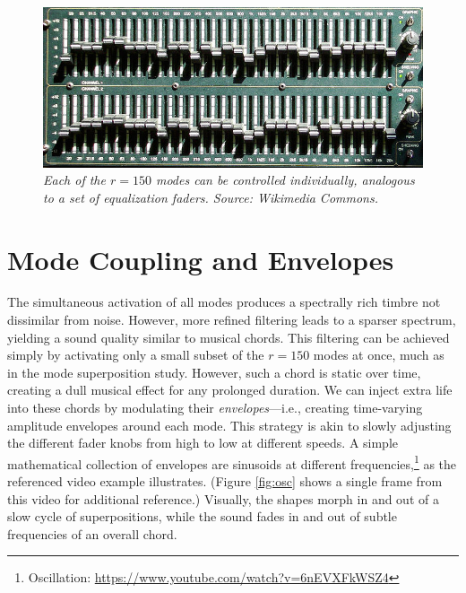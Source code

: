 \begin{figure}[H]
	\centering
	\includegraphics[width=\textwidth]{chap6/figures/faders.jpg}
	\caption{\em Each of the $r = 150$ modes can be controlled individually, analogous to a set of equalization faders. Source: Wikimedia Commons.}
\label{fig:faders}
\end{figure}

\section{Mode Coupling and Envelopes}
The simultaneous activation of all modes produces a spectrally rich timbre not dissimilar from noise. However, more refined filtering leads to a sparser spectrum, yielding a sound quality similar to musical chords. This filtering
can be achieved simply by activating only a small subset of the $r = 150$ modes at once, much as in the mode superposition study. However, such a chord is static over time, creating a dull musical effect for any prolonged 
duration. We can inject extra life into these chords by modulating their {\em envelopes}---i.e., creating time-varying amplitude envelopes around each mode. This strategy is akin to slowly adjusting the different fader knobs 
from high to low at different speeds. A simple mathematical collection of envelopes are sinusoids at different frequencies,\footnote{Oscillation: \url{https://www.youtube.com/watch?v=6nEVXFkWSZ4}} as the referenced video example illustrates. 
(Figure \ref{fig:osc} shows a single frame from this video for additional reference.) Visually, the shapes morph in and out of a slow cycle of superpositions, while the sound fades in and out of subtle frequencies of an overall chord.

